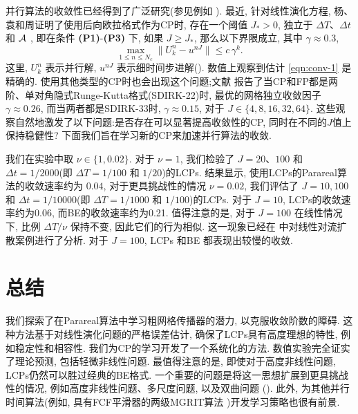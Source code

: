 并行算法的收敛性已经得到了广泛研究(参见例如 \cite{Bal:2005,BrehierWang:2020,FriedhoffSouthworth:2021,GanderVandewalle:2007,Mathew:2010,Wu:IMA2015,WuZhou:2015,yang2021robust}). 
最近, 针对线性演化方程, 杨、袁和周证明了使用后向欧拉格式作为CP时, 存在一个阈值 $J_*>0$, 独立于 $\Delta T$、$\Delta t$ 和 ${\mathcal{A}}$ , 即在条件 {\bf{(P1)}}-{\bf{(P3)}} 下, 如果 $J\ge J_*$, 那么以下界限成立, 其中 $\gamma \approx 0.3$, 
\begin{equation}\label{eqn:conv-1}
	\max_{1 \le n\le N_c}\|  U_{k}^n - u^{nJ}  \| \le  c \,\gamma^k.
\end{equation}
这里, $U_k^n$ 表示并行解, $u^{nJ}$ 表示细时间步进解(\cite{yang2021robust}). 数值上观察到估计 \eqref{eqn:conv-1} 是精确的. 使用其他类型的CP时也会出现这个问题;文献 \cite{FriedhoffSouthworth:2021} 报告了当CP和FP都是两阶、单对角隐式Runge-Kutta格式(SDIRK-22)时, 最优的网格独立收敛因子 $\gamma \approx 0.26$, 而当两者都是SDIRK-33时, $\gamma \approx 0.15$, 对于 $J\in \{4, 8, 16, 32,64\}$. 这些观察自然地激发了以下问题:是否存在可以显著提高收敛性的CP, 同时在不同的$J$值上保持稳健性? 下面我们旨在学习新的CP来加速并行算法的收敛. 




我们在实验中取 $\nu \in \{1, 0.02 \}$.  对于 $\nu =1$, 我们检验了 $J=20$、$100$ 和 $\Delta t = 1/2000$(即 $\Delta T=1/100$ 和 $1/20$)的LCPs. 结果显示, 使用LCPs的Parareal算法的收敛速率约为 $0.04$, 对于更具挑战性的情况 $\nu =0.02$, 我们评估了 $J=10, 100$ 和 $\Delta t = 1/10000$(即 $\Delta T=1/1000$ 和 $1/100$)的LCPs. 对于 $J=10$, LCPs的收敛速率约为0.06, 而BE的收敛速率约为0.21. 值得注意的是, 对于 $J=100$ 在线性情况下, 比例 $\Delta T / \nu $ 保持不变, 因此它们的行为相似. 这一现象已经在 \cite{gander2020reynolds} 中对线性对流扩散案例进行了分析. 对于 $J=100$, LCPs 和BE 都表现出较慢的收敛. 



\section{总结}
我们探索了在Parareal算法中学习粗网格传播器的潜力, 以克服收敛阶数的障碍. 这种方法基于对线性演化问题的严格误差估计, 确保了LCPs具有高度理想的特性, 例如稳定性和相容性. 我们为CP的学习开发了一个系统化的方法. 数值实验完全证实了理论预测, 包括轻微非线性问题. 最值得注意的是, 即使对于高度非线性问题, LCPs仍然可以胜过经典的BE格式. 一个重要的问题是将这一思想扩展到更具挑战性的情况, 例如高度非线性问题、多尺度问题, 以及双曲问题 (\cite{DeSterck:2021,LiHu:2021}). 此外, 为其他并行时间算法(例如, 具有FCF平滑器的两级MGRIT算法 \cite{FriedhoffSouthworth:2021,Southworth:2019})开发学习策略也很有前景. 